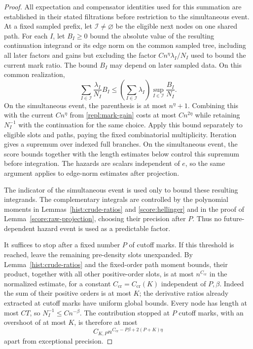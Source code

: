 \begin{proof}
All expectation and compensator identities used for this summation are
established in their stated filtrations before restriction to the
simultaneous event.  At a fixed sampled prefix, let $\mathcal I\ne\varnothing$
be the eligible next nodes on one shared path.  For each $I$, let $B_I\ge0$
bound the absolute value of the resulting continuation integrand or its edge norm on the common
sampled tree, including all later factors and gains but excluding the factor
$C n^\eta\lambda_I/N_I$ used to bound the current mark ratio.  The bound $B_I$
may depend on later sampled data.  On this common realization,
\[
 \sum_{I\in\mathcal I}\frac{\lambda_I}{N_I}B_I
 \le \left(\sum_{I\in\mathcal I}\lambda_I\right)
          \sup_{I\in\mathcal I}\frac{B_I}{N_I}.
\]
On the simultaneous event, the parenthesis is at most $n^\eta+1$.
Combining this with the current $C n^\eta$ from \eqref{repl:mark-gain}
costs at most $C n^{2\eta}$ while retaining $N_I^{-1}$ with the continuation
for the same choice.  Apply this bound separately to eligible slots and paths,
paying the fixed combinatorial multiplicity.  Iteration gives a supremum over
indexed full branches.  On the simultaneous event, the score bounds together
with the length estimates below control this supremum before integration.  The hazards are
scalars independent of $e$, so the same argument applies to edge-norm
estimates after projection.

The indicator of the simultaneous event is used only to bound these
resulting integrands.  The complementary integrals are
controlled by the polynomial moments in Lemmas~\ref{hist:crude-ratios}
and \ref{score:hellinger} and in the proof of
Lemma~\ref{score:raw-projection}, choosing their precision after $P$.
Thus no future-dependent hazard event is used
as a predictable factor.

It suffices to stop after a fixed number $P$ of cutoff marks.  If this
threshold is reached, leave the remaining pre-density slots unexpanded.  By
Lemma~\ref{hist:crude-ratios} and the fixed-order path moment bounds, their
product, together with all other positive-order slots, is at most
$n^{C_{\mathrm{cr}}}$ in the normalized estimate, for a constant
$C_{\mathrm{cr}}=C_{\mathrm{cr}}(K)$ independent of $P,\beta$.
Indeed the sum of their positive orders is at most $K$; the derivative
ratios already extracted at cutoff marks have uniform global bounds.  Every
node has length at most $CT$, so $N_I^{-1}\le Cn^{-\beta}$.  The contribution
stopped at $P$ cutoff marks, with an overshoot of at most $K$, is therefore
at most
\begin{equation}\label{repl:depth-remainder}
 C_{K,P}n^{C_{\mathrm{cr}}-P\beta+2(P+K)\eta}
\end{equation}
apart from exceptional precision.


\end{proof}
